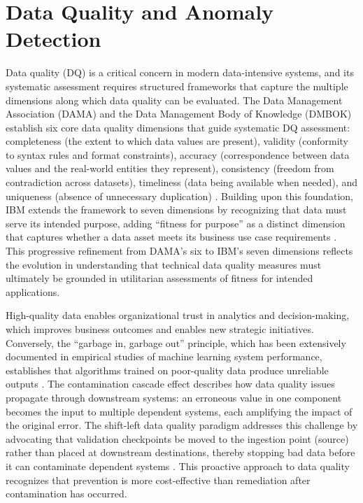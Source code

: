 \section{Data Quality and Anomaly Detection}

Data quality (DQ) is a critical concern in modern data-intensive systems, and its systematic assessment requires structured frameworks that capture the multiple dimensions along which data quality can be evaluated. The Data Management Association (DAMA) and the Data Management Body of Knowledge (DMBOK) establish six core data quality dimensions that guide systematic DQ assessment: completeness (the extent to which data values are present), validity (conformity to syntax rules and format constraints), accuracy (correspondence between data values and the real-world entities they represent), consistency (freedom from contradiction across datasets), timeliness (data being available when needed), and uniqueness (absence of unnecessary duplication) \citep{dama2017dmbok}. Building upon this foundation, IBM extends the framework to seven dimensions by recognizing that data must serve its intended purpose, adding ``fitness for purpose'' as a distinct dimension that captures whether a data asset meets its business use case requirements \citep{ibm_dq2024}. This progressive refinement from DAMA's six to IBM's seven dimensions reflects the evolution in understanding that technical data quality measures must ultimately be grounded in utilitarian assessments of fitness for intended applications.

High-quality data enables organizational trust in analytics and decision-making, which improves business outcomes and enables new strategic initiatives. Conversely, the ``garbage in, garbage out'' principle, which has been extensively documented in empirical studies of machine learning system performance, establishes that algorithms trained on poor-quality data produce unreliable outputs \citep{ibm_dq2024}. The contamination cascade effect describes how data quality issues propagate through downstream systems: an erroneous value in one component becomes the input to multiple dependent systems, each amplifying the impact of the original error. The shift-left data quality paradigm addresses this challenge by advocating that validation checkpoints be moved to the ingestion point (source) rather than placed at downstream destinations, thereby stopping bad data before it can contaminate dependent systems \citep{confluent_2025}. This proactive approach to data quality recognizes that prevention is more cost-effective than remediation after contamination has occurred.

